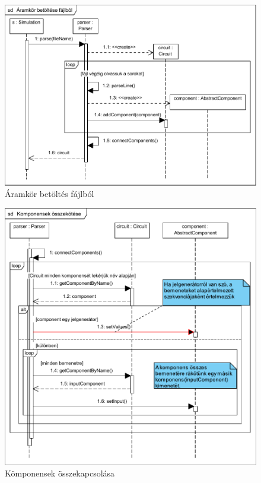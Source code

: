 \begin{figure}[H]
\begin{center}
\includegraphics[width=17cm]{chapters/chapter04/seqdiagrams/aramkor_betoltes.pdf}
\caption{Áramkör betöltés fájlból}
\label{fig:aramkor_betoltes}
\end{center}
\end{figure}

\begin{figure}[H]
\begin{center}
\includegraphics{chapters/chapter04/seqdiagrams/connectcomponents.pdf}
\caption{Kömponensek összekapcsolása}
\label{fig:connect_components}
\end{center}
\end{figure}

